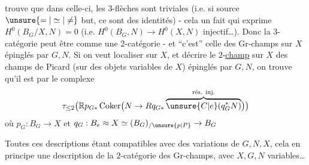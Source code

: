 trouve que dans celle-ci, les $3$-flèches sont triviales (i.e. si source $\unsure{=|\simeq|\ne}$ but, ce sont des identités) - cela un fait qui exprime $H^{0}(B_{G}/X,N)=0$ (i.e. $H^{0}(B_{G},N)\to H^{0}(X,N)$ injectif\ldots). Donc la $3$-catégorie peut être  comme une $2$-catégorie - et ``c'est'' celle des Gr-champs sur $X$ épinglés par $G,N$. Si on veut localiser sur $X$, et décrire le $2$-\uline{champ}  sur $X$ des champs de Picard (sur des objets variables de $X$) épinglés par $G,N$, on trouve qu'il est  par le complexe
\[
\tau_{\leq 2}\bigl(\mathbb R p_{G*}\operatorname{Coker}\bigl(N\to Rq_{G*}\overbrace{\unsure{C|e}(q_{G}^{*}N)}^{\text{rés. inj.}}\bigr)\bigr)
\]
où $p_{G}:B_{G}\to X$ et $q_{G}:B_{e}\approx X\simeq(B_{G})_{/\unsure{p|P}}\to B_{G}$

Toutes ces descriptions étant compatibles avec des variations de $G,N,X$, cela  en principe une description de la $2$-catégorie des Gr-champs, avec $X,G,N$ variables\ldots
